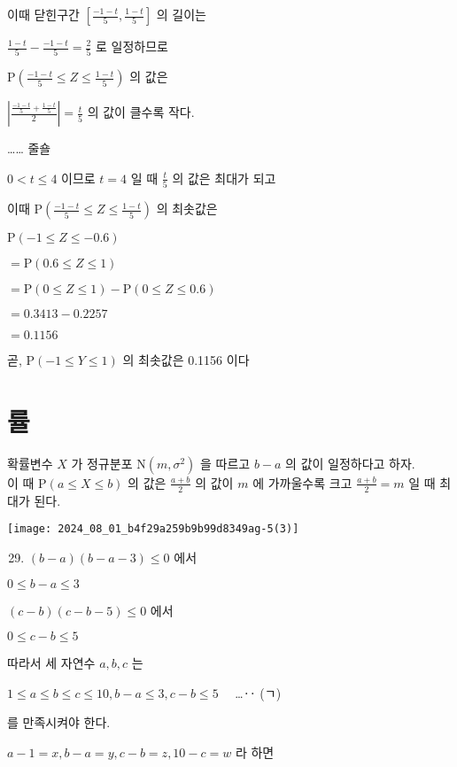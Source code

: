 \documentclass[10pt]{article}
\begin{document}
이때 닫힌구간 $\left[\frac{-1-t}{5}, \frac{1-t}{5}\right]$ 의 길이는

$\frac{1-t}{5}-\frac{-1-t}{5}=\frac{2}{5}$ 로 일정하므로

$\mathrm{P}\left(\frac{-1-t}{5} \leq Z \leq \frac{1-t}{5}\right)$ 의 값은

$\left|\frac{\frac{-1-t}{5}+\frac{1-t}{5}}{2}\right|=\frac{t}{5}$ 의 값이 클수록 작다.

…… 줄숄

$0<t \leq 4$ 이므로 $t=4$ 일 때 $\frac{t}{5}$ 의 값은 최대가 되고

이때 $\mathrm{P}\left(\frac{-1-t}{5} \leq Z \leq \frac{1-t}{5}\right)$ 의 최솟값은

$\mathrm{P}(-1 \leq Z \leq-0.6)$

$=\mathrm{P}(0.6 \leq Z \leq 1)$

$=\mathrm{P}(0 \leq Z \leq 1)-\mathrm{P}(0 \leq Z \leq 0.6)$

$=0.3413-0.2257$

$=0.1156$

곧, $\mathrm{P}(-1 \leq Y \leq 1)$ 의 최솟값은 0.1156 이다

\section*{률}
확률변수 $X$ 가 정규분포 $\mathrm{N}\left(m, \sigma^{2}\right)$ 을 따르고 $b-a$ 의 값이 일정하다고 하자.\\
이 때 $\mathrm{P}(a \leq X \leq b)$ 의 값은 $\frac{a+b}{2}$ 의 값이 $m$ 에 가까울수록 크고 $\frac{a+b}{2}=m$ 일 때 최대가 된다.

\begin{center}
\texttt{[image: 2024\_08\_01\_b4f29a259b9b99d8349ag-5(3)]}
\end{center}

\begin{enumerate}
  \setcounter{enumi}{28}
  \item $(b-a)(b-a-3) \leq 0$ 에서
\end{enumerate}

$0 \leq b-a \leq 3$

$(c-b)(c-b-5) \leq 0$ 에서

$0 \leq c-b \leq 5$

따라서 세 자연수 $a, b, c$ 는

$1 \leq a \leq b \leq c \leq 10, b-a \leq 3, c-b \leq 5 \quad$ …‥ (ㄱ)

를 만족시켜야 한다.

$a-1=x, b-a=y, c-b=z, 10-c=w$ 라 하면
\end{document}
